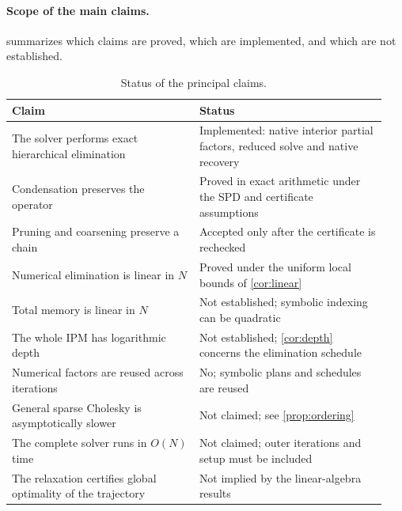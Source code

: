 \paragraph{Scope of the main claims.}
 summarizes which claims are proved, which are implemented, and
which are not established.

\begin{table}[htbp]
\centering
\caption{Status of the principal claims.}
\label{tab:claims}
\small
\begin{tabular}{@{}p{0.47\linewidth}p{0.47\linewidth}@{}}
\toprule
Claim & Status\\
\midrule
The solver performs exact hierarchical elimination & Implemented: native interior partial factors, reduced solve and native recovery\\
Condensation preserves the operator & Proved in exact arithmetic under the SPD and certificate assumptions\\
Pruning and coarsening preserve a chain & Accepted only after the certificate is rechecked\\
Numerical elimination is linear in $N$ & Proved under the uniform local bounds of \cref{cor:linear}\\
Total memory is linear in $N$ & Not established; symbolic indexing can be quadratic\\
The whole IPM has logarithmic depth & Not established; \cref{cor:depth} concerns the elimination schedule\\
Numerical factors are reused across iterations & No; symbolic plans and schedules are reused\\
General sparse Cholesky is asymptotically slower & Not claimed; see \cref{prop:ordering}\\
The complete solver runs in $O(N)$ time & Not claimed; outer iterations and setup must be included\\
The relaxation certifies global optimality of the trajectory & Not implied by the linear-algebra results\\
\bottomrule
\end{tabular}
\end{table}
